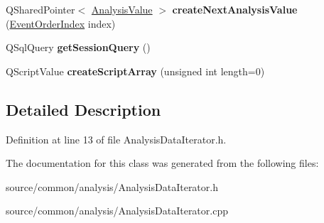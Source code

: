 \begin{DoxyCompactItemize}
\item 
\hypertarget{class_picto_1_1_analysis_data_iterator_a26fae30d3ddc35773da0aaf340bdbd67}{Q\-Shared\-Pointer$<$ \hyperlink{struct_picto_1_1_analysis_value}{Analysis\-Value} $>$ {\bfseries create\-Next\-Analysis\-Value} (\hyperlink{class_picto_1_1_event_order_index}{Event\-Order\-Index} index)}\label{class_picto_1_1_analysis_data_iterator_a26fae30d3ddc35773da0aaf340bdbd67}

\item 
\hypertarget{class_picto_1_1_analysis_data_iterator_a0a6c9bb6e17f8dded407434ccc3c9ba0}{Q\-Sql\-Query {\bfseries get\-Session\-Query} ()}\label{class_picto_1_1_analysis_data_iterator_a0a6c9bb6e17f8dded407434ccc3c9ba0}

\item 
\hypertarget{class_picto_1_1_analysis_data_iterator_a2f7d67979abb15dc28709e2e7262d41b}{Q\-Script\-Value {\bfseries create\-Script\-Array} (unsigned int length=0)}\label{class_picto_1_1_analysis_data_iterator_a2f7d67979abb15dc28709e2e7262d41b}

\end{DoxyCompactItemize}


\subsection{Detailed Description}


Definition at line 13 of file Analysis\-Data\-Iterator.\-h.



The documentation for this class was generated from the following files\-:\begin{DoxyCompactItemize}
\item 
source/common/analysis/Analysis\-Data\-Iterator.\-h\item 
source/common/analysis/Analysis\-Data\-Iterator.\-cpp\end{DoxyCompactItemize}
